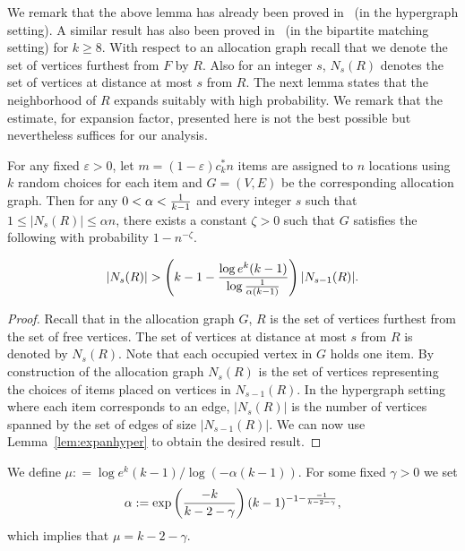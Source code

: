 We remark that the above lemma has already been proved in~\cite{art:fps10} (in the hypergraph setting). A similar result has also been proved in~\cite{fm12} (in the bipartite matching setting) for $k\ge 8$.
With respect to an allocation graph recall that we denote the set of vertices furthest from $F$ by $R$. Also for an integer $s$, $N_s(R)$ denotes the set of vertices at distance at most $s$ from $R$. The next lemma states that the neighborhood of $R$ expands suitably with high probability. We remark that the estimate, for expansion factor, presented here is not the best possible but nevertheless suffices for our analysis. 
\begin{lemma}\label{lem:expan}
For any fixed $\varepsilon>0$, let $m=(1-\varepsilon) c_k^* n$ items are assigned to $n$ locations using $k$ random choices for each item and $G=(V,E)$ be the corresponding allocation graph. Then for any $0<\alpha < {1\over k-1}$ and every integer $s$ such that $1\le | N_{s}(R)|\le \alpha n$,  there exists a constant $\zeta>0$ such that $G$  satisfies the following with probability $1-n^{-\zeta}$.

\[
	|N_{s}(R) | >  \left( k-1- {\log e^{k}(k-1) \over \log{1\over \alpha(k-1)}}\right)  | N_{s-1}(R)| . \]
	
\end{lemma}
\begin{proof}
Recall that in the allocation graph $G$,  $R$ is the set of vertices furthest from the set of free vertices. The set of vertices at distance at most $s$ from $R$ is denoted by $N_{s}(R)$. Note that each occupied vertex in $G$ holds one item. By construction of the allocation graph $N_{s}(R)$ is the set of vertices representing the choices of items placed on vertices in $N_{s-1}(R)$. In the hypergraph setting where each item corresponds to an edge, $|N_{s}(R)|$ is the number of vertices spanned by the set of edges of size  $|N_{s-1}(R)|$. We can now use Lemma~\ref{lem:expanhyper} to obtain the desired result.
\end{proof}
We define $\mu: =   {\log e^{k}(k-1)/ \log {(- \alpha(k-1))}} .$ For some fixed $\gamma >0$ we set 
\begin{equation} \label{eq:alpha}
\alpha := \exp\left({-k\over k-2-\gamma}\right) (k-1)^{-1- {-1\over k-2-\gamma}},
\end{equation}
which implies that $\mu = k-2-\gamma$.


